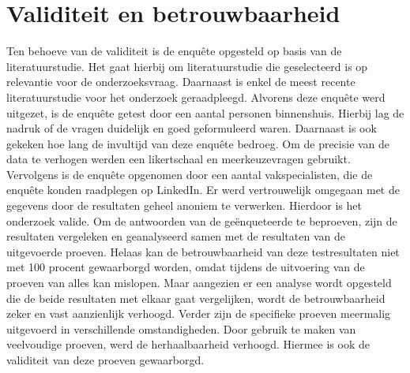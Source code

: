 \section{Validiteit en betrouwbaarheid}
Ten behoeve van de validiteit is de enquête opgesteld op basis van de literatuurstudie. Het gaat hierbij om literatuurstudie die geselecteerd is op relevantie voor de onderzoeksvraag. Daarnaast is enkel de meest recente literatuurstudie voor het onderzoek geraadpleegd.
\newline
\newline
Alvorens deze enquête werd uitgezet, is de enquête getest door een aantal personen binnenshuis. Hierbij lag de nadruk of de vragen duidelijk en goed geformuleerd waren. Daarnaast is ook gekeken hoe lang de invultijd van deze enquête bedroeg. Om de precisie van de data te verhogen werden een likertschaal en meerkeuzevragen gebruikt. Vervolgens is de enquête opgenomen door een aantal vakspecialisten, die de enquête konden raadplegen op LinkedIn. Er werd vertrouwelijk omgegaan met de gegevens door de resultaten geheel anoniem te verwerken. Hierdoor is het onderzoek valide.
\newline
\newline
Om de antwoorden van de geënqueteerde te beproeven, zijn de resultaten vergeleken en geanalyseerd samen met de resultaten van de uitgevoerde proeven. Helaas kan de betrouwbaarheid van deze testresultaten niet met 100 procent gewaarborgd worden, omdat tijdens de uitvoering van de proeven van alles kan mislopen. Maar aangezien er een analyse wordt opgesteld die de beide resultaten met elkaar gaat vergelijken, wordt de betrouwbaarheid zeker en vast aanzienlijk verhoogd.
\newline
\newline
Verder zijn de specifieke proeven meermalig uitgevoerd in verschillende omstandigheden. Door gebruik te maken van veelvoudige proeven, werd de herhaalbaarheid verhoogd. Hiermee is ook de validiteit van deze proeven gewaarborgd.

